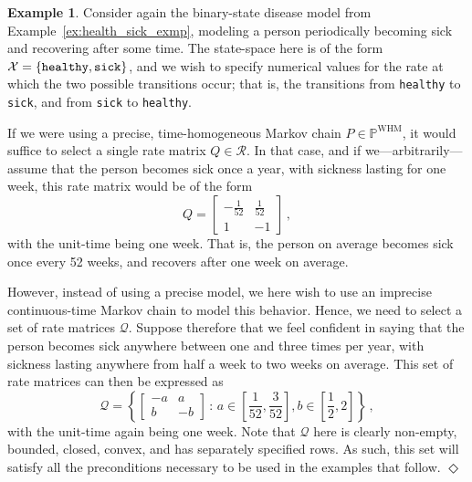 \documentclass[10pt,a4paper]{paper}
\theoremstyle{definition}
\newtheorem{exmp}{Example}%
\newcommand{\states}{\mathcal{X}}
\newcommand{\processes}{\mathbb{P}}
\newcommand{\whmprocesses}{\processes^{\mathrm{WHM}}}
\newcommand{\rateset}{\mathcal{Q}}
\newcommand{\exampleend}{\hfill$\Diamond$}
\begin{document}

\begin{exmp}\label{exmp:example_rateset_simple_model}
Consider again the binary-state disease model from Example~\ref{ex:health_sick_exmp}, modeling a person periodically becoming sick and recovering after some time. The state-space here is of the form $\states=\{\text{{\tt healthy}},\text{{\tt sick}}\}$, and we wish to specify numerical values for the rate at which the two possible transitions occur; that is, the transitions from {\tt healthy} to {\tt sick}, and from {\tt sick} to {\tt healthy}.

If we were using a precise, time-homogeneous Markov chain $P\in\whmprocesses$, it would suffice to select a single rate matrix $Q\in\mathcal{R}$. In that case, and if we---arbitrarily---assume that the person becomes sick once a year, with sickness lasting for one week, this rate matrix would be of the form
\begin{equation*}
Q = \left[ \begin{array}{rr}
-\frac{1}{52} & \frac{1}{52} \\
1 & -1
\end{array}\right]\,,
\end{equation*}
with the unit-time being one week. That is, the person on average becomes sick once every 52 weeks, and recovers after one week on average.

However, instead of using a precise model, we here wish to use an imprecise continuous-time Markov chain to model this behavior. Hence, we need to select a set of rate matrices $\rateset$. Suppose therefore that we feel confident in saying that the person becomes sick anywhere between one and three times per year, with sickness lasting anywhere from half a week to two weeks on average. This set of rate matrices can then be expressed as
\begin{equation}\label{eq:num_example_rateset_params}
\rateset = \left\{\left[\begin{array}{rr}
-a & a \\
b & -b
\end{array}\right]\,:\,a\in\left[\frac{1}{52},\frac{3}{52}\right], b\in\left[\frac{1}{2},2\right]\right\}\,,
\end{equation}
with the unit-time again being one week. Note that $\rateset$ here is clearly non-empty, bounded, closed, convex, and has separately specified rows. As such, this set will satisfy all the preconditions necessary to be used in the examples that follow.
\exampleend
\end{exmp}
\end{document}
